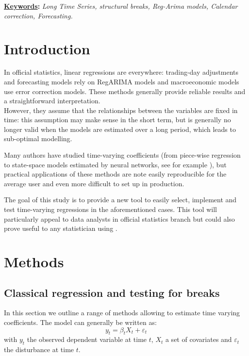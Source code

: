 \documentclass[12pt,a4paper]{article}
\title{
\vspace{-5ex}
\thetitle
\vspace{-2ex}
}
\author{
\theauthors
\vspace{-5ex}
}
\date{}
\def\thekeywords{
\textit{Long Time Series, structural breaks, Reg-Arima models, Calendar correction, Forecasting.}
}
\begin{document}
\cfoot{\thepage} %

\sectionfont{\large\textsc}

\maketitle
{\fontsize{10pt}{12.0pt}\selectfont \textbf{\uline{Keywords}:} \thekeywords\par}\par


\section{Introduction}

In official statistics, linear regressions are everywhere: trading-day adjustments and forecasting models rely on RegARIMA models and macroeconomic models use error correction models. These methods generally provide reliable results and a straightforward interpretation.\\

However, they assume that the relationships between the variables are fixed in time: this assumption may make sense in the short term, but is generally no longer valid when the models are estimated over a long period, which leads to sub-optimal modelling.

Many authors have studied time-varying coefficients (from piece-wise regression to state-space models estimated by neural networks, see for example \cite{rangapuram2018deep}), but practical applications of these methods are note easily reproducible for the average user and even more difficult to set up in production.

The goal of this study is to provide a new  tool to easily select, implement and test time-varying regressions in the aforementioned cases. This tool will particularly appeal to data analysts in official statistics branch but could also prove useful to any statistician using . 

\section{Methods}

\subsection{Classical regression and testing for breaks}
In this section we outline a range of methods allowing to estimate time varying coefficients.
The model can generally be written as:
\[
y_t=\beta_t X_t+\varepsilon_t
\]
with \(y_t\) the observed dependent variable at time \(t\), \(X_t\) a set of covariates and \(\varepsilon_t\) the disturbance at time \(t\).
\end{document}
